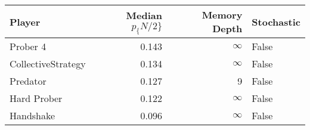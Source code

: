 \begin{tabular}{lrrl}
\toprule
             Player &  Median $p_\{N/2\}$ &  Memory Depth & Stochastic \\
\midrule
           Prober 4 &             0.143 &            \(\infty\) &      False \\
 CollectiveStrategy &             0.134 &            \(\infty\) &      False \\
           Predator &             0.127 &             9 &      False \\
        Hard Prober &             0.122 &            \(\infty\) &      False \\
          Handshake &             0.096 &            \(\infty\) &      False \\
\bottomrule
\end{tabular}
